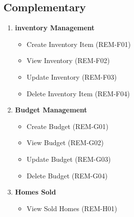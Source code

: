 \documentclass[11pt]{article}
\begin{document}
		\subsection{Complementary}
		\begin{enumerate}[i]
			\item \textbf{inventory Management}
			\begin{itemize}
				\item Create Inventory Item (REM-F01)
				\item View Inventory (REM-F02)
				\item Update Inventory (REM-F03)
				\item Delete Inventory Item (REM-F04)
			\end{itemize}
			
			\item \textbf{Budget Management}
			\begin{itemize}
				\item Create Budget (REM-G01)
				\item View Budget (REM-G02)
				\item Update Budget (REM-G03)
				\item Delete Budget (REM-G04)
			\end{itemize}
			
			\item \textbf{Homes Sold}
			\begin{itemize}
				\item View Sold Homes (REM-H01)
			\end{itemize}
		\end{enumerate}
		
\end{document}
